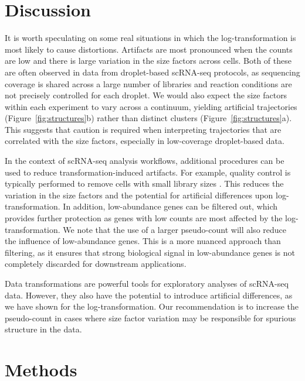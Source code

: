 \documentclass[10pt,letterpaper]{article}
\begin{document}
\section{Discussion}
It is worth speculating on some real situations in which the log-transformation is most likely to cause distortions.
Artifacts are most pronounced when the counts are low and there is large variation in the size factors across cells.
Both of these are often observed in data from droplet-based scRNA-seq protocols, as sequencing coverage is shared across a large number of libraries and reaction conditions are not precisely controlled for each droplet.
We would also expect the size factors within each experiment to vary across a continuum, yielding artificial trajectories (Figure~\ref{fig:structures}b) rather than distinct clusters (Figure~\ref{fig:structures}a).
This suggests that caution is required when interpreting trajectories that are correlated with the size factors, especially in low-coverage droplet-based data.

In the context of scRNA-seq analysis workflows, additional procedures can be used to reduce transformation-induced artifacts.
For example, quality control is typically performed to remove cells with small library sizes \cite{ilicic2016classification,lun2016stepbystep}.
This reduces the variation in the size factors and the potential for artificial differences upon log-transformation.
In addition, low-abundance genes can be filtered out, which provides further protection as genes with low counts are most affected by the log-transformation.
We note that the use of a larger pseudo-count will also reduce the influence of low-abundance genes.
This is a more nuanced approach than filtering, as it ensures that strong biological signal in low-abundance genes is not completely discarded for downstream applications.

Data transformations are powerful tools for exploratory analyses of scRNA-seq data.
However, they also have the potential to introduce artificial differences, as we have shown for the log-transformation.
Our recommendation is to increase the pseudo-count in cases where size factor variation may be responsible for spurious structure in the data.

\section{Methods}
\end{document}
